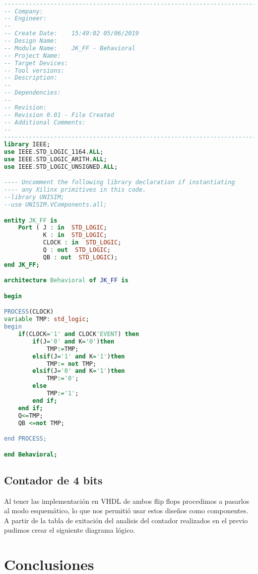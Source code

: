 \documentclass{mylib/reporteConCalif}
\begin{document}
\begin{lstlisting}[language=VHDL]

----------------------------------------------------------------------------------
-- Company:
-- Engineer:
--
-- Create Date:    15:49:02 05/06/2019
-- Design Name:
-- Module Name:    JK_FF - Behavioral
-- Project Name:
-- Target Devices:
-- Tool versions:
-- Description:
--
-- Dependencies:
--
-- Revision:
-- Revision 0.01 - File Created
-- Additional Comments:
--
----------------------------------------------------------------------------------
library IEEE;
use IEEE.STD_LOGIC_1164.ALL;
use IEEE.STD_LOGIC_ARITH.ALL;
use IEEE.STD_LOGIC_UNSIGNED.ALL;

---- Uncomment the following library declaration if instantiating
---- any Xilinx primitives in this code.
--library UNISIM;
--use UNISIM.VComponents.all;

entity JK_FF is
    Port ( J : in  STD_LOGIC;
           K : in  STD_LOGIC;
           CLOCK : in  STD_LOGIC;
           Q : out  STD_LOGIC;
           QB : out  STD_LOGIC);
end JK_FF;

architecture Behavioral of JK_FF is

begin

PROCESS(CLOCK)
variable TMP: std_logic;
begin
	if(CLOCK='1' and CLOCK'EVENT) then
		if(J='0' and K='0')then
			TMP:=TMP;
		elsif(J='1' and K='1')then
			TMP:= not TMP;
		elsif(J='0' and K='1')then
			TMP:='0';
		else
			TMP:='1';
		end if;
	end if;
	Q<=TMP;
	QB <=not TMP;

end PROCESS;

end Behavioral;

\end{lstlisting}

\subsection{Contador de 4 bits}

Al tener las implementación en VHDL de ambos flip flops procedimos a pasarlos al modo esquemático, lo que nos permitió usar estos diseños como componentes.\\

A partir de la tabla de exitación del analisis del contador realizados en el previo pudimos crear el siguiente diagrama lógico.


\section{Conclusiones}
\end{document}

